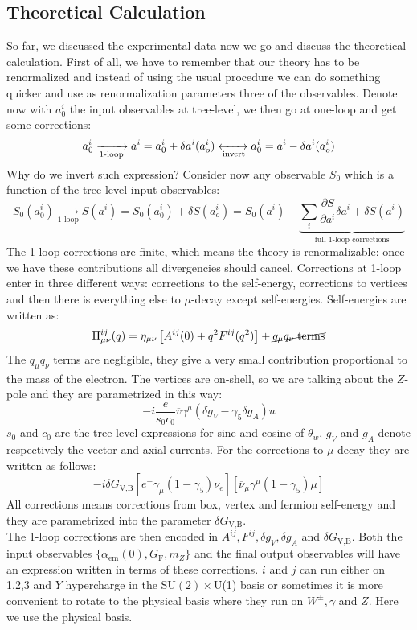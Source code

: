 \documentclass[../main.tex]{subfiles}
\begin{document}
\subsection{Theoretical Calculation}
So far, we discussed the experimental data now we go and discuss the theoretical calculation. First of all, we have to remember that our theory has to be renormalized and instead of using the usual procedure we can do something quicker and use as renormalization parameters three of the observables. Denote now with $a^i_0$ the input observables at tree-level, we then go at one-loop and get some corrections:
\[
a_0^i\xrightarrow[\text{1-loop}]{}a^i=a_0^i+\delta a^i(a_o^i)\xleftrightarrow[\text{invert}]{}a_0^i=a^i-\delta a^i(a_o^i)
\]
Why do we invert such expression? Consider now any observable $S_0$ which is a function of the tree-level input observables:
\[
S_0(a_0^i)\xrightarrow[\text{1-loop}]{}S(a^i)=S_0(a_0^i)+\delta S(a_o^i)=S_0(a^i)-\underbrace{\sum_i\frac{\partial S}{\partial a^i}\delta a^i+\delta S(a^i)}_{\text{full 1-loop corrections}}
\]
The 1-loop corrections are finite, which means the theory is renormalizable: once we have these contributions all divergencies should cancel. Corrections at 1-loop enter in three different ways: corrections to the self-energy, corrections to vertices and then there is everything else to $\mu$-decay except self-energies. Self-energies are written as:
\[
\Pi_{\mu\nu}^{ij}(q)=\eta_{\mu\nu}\left[A^{ij}(0)+q^2F^{ij}(q^2)\right]+\cancel{q_\mu q_\nu\;\text{terms}}
\]
The $q_\mu q_\nu$ terms are negligible, they give a very small contribution proportional to the mass of the electron. The vertices are on-shell, so we are talking about the $Z$-pole and they are parametrized in this way:
\[
-i\frac{e}{s_0c_0}\overline{v}\gamma^\mu(\delta g_V-\gamma_5\delta g_A)u
\]
$s_0$ and $c_0$ are the tree-level expressions for sine and cosine of $\theta_w$, $g_V$ and $g_A$ denote respectively the vector and axial currents. For the corrections to $\mu$-decay they are written as follows:
\[
-i\delta G_{\text{V,B}}[e^-\gamma_\mu(1-\gamma_5)\nu_e][\overline{\nu}_\mu\gamma^\mu(1-\gamma_5)\mu]
\]
All corrections means corrections from box, vertex and fermion self-energy and they are parametrized into the parameter $\delta G_{\text{V,B}}$.\\
The 1-loop corrections are then encoded in $A^{ij}, F^{ij}, \delta g_V, \delta g_A$ and $\delta G_{\text{V,B}}$. Both the input observables $\{\alpha_{\text{em}}(0), G_{\text{F}}, m_Z \}$ and the final output observables will have an expression written in terms of these corrections. $i$ and $j$ can run either on 1,2,3 and $Y$ hypercharge in the SU$(2)\times$U(1) basis or sometimes it is more convenient to rotate to the physical basis where they run on $W^\pm,\gamma$ and $Z$. Here we use the physical basis.
\end{document}
